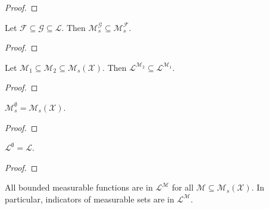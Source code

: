 \begin{proof}

\end{proof}


\begin{lemma}\label{lem:integrableMeasures_anti}
Let $\mathcal{F} \subseteq \mathcal{G} \subseteq \mathcal{L}$.
Then $\mathcal{M}_s^{\mathcal{G}} \subseteq \mathcal{M}_s^{\mathcal{F}}$.
\end{lemma}

\begin{proof}

\end{proof}


\begin{lemma}\label{lem:integrableFunctions_anti}
Let $\mathcal{M}_1 \subseteq \mathcal{M}_2 \subseteq \mathcal{M}_s(\mathcal{X})$.
Then $\mathcal{L}^{\mathcal{M}_2} \subseteq \mathcal{L}^{\mathcal{M}_1}$.
\end{lemma}

\begin{proof}

\end{proof}


\begin{lemma}\label{lem:integrableMeasures_empty}
$\mathcal{M}_s^{\emptyset} = \mathcal{M}_s(\mathcal{X})$.
\end{lemma}

\begin{proof}

\end{proof}


\begin{lemma}\label{lem:integrableFunctions_empty}
  $\mathcal{L}^{\emptyset} = \mathcal{L}$.
\end{lemma}

\begin{proof}

\end{proof}


\begin{lemma}\label{lem:bounded_subset_integrableFunctions}
  All bounded measurable functions are in $\mathcal{L}^{\mathcal{M}}$ for all $\mathcal{M} \subseteq \mathcal{M}_s(\mathcal{X})$. In particular, indicators of measurable sets are in $\mathcal{L}^{\mathcal{M}}$.
\end{lemma}

